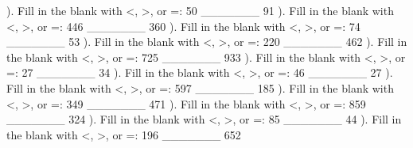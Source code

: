 \documentclass{article}%
\begin{document}
\newline%
). Fill in the blank with <, >, or =: 50 \_\_\_\_\_\_\_ 91%
\newline%
\newline%
). Fill in the blank with <, >, or =: 446 \_\_\_\_\_\_\_ 360%
\newline%
\newline%
). Fill in the blank with <, >, or =: 74 \_\_\_\_\_\_\_ 53%
\newline%
\newline%
). Fill in the blank with <, >, or =: 220 \_\_\_\_\_\_\_ 462%
\newline%
\newline%
). Fill in the blank with <, >, or =: 725 \_\_\_\_\_\_\_ 933%
\newline%
\newline%
). Fill in the blank with <, >, or =: 27 \_\_\_\_\_\_\_ 34%
\newline%
\newline%
). Fill in the blank with <, >, or =: 46 \_\_\_\_\_\_\_ 27%
\newline%
\newline%
). Fill in the blank with <, >, or =: 597 \_\_\_\_\_\_\_ 185%
\newline%
\newline%
). Fill in the blank with <, >, or =: 349 \_\_\_\_\_\_\_ 471%
\newline%
\newline%
). Fill in the blank with <, >, or =: 859 \_\_\_\_\_\_\_ 324%
\newline%
\newline%
). Fill in the blank with <, >, or =: 85 \_\_\_\_\_\_\_ 44%
\newline%
\newline%
). Fill in the blank with <, >, or =: 196 \_\_\_\_\_\_\_ 652%
\newline%
\newline%
\end{document}
